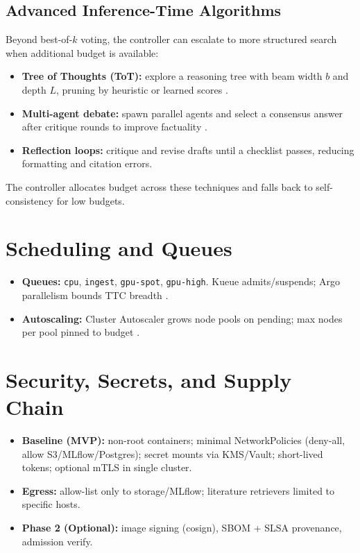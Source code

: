 \subsection{Advanced Inference-Time Algorithms}
Beyond best-of-\(k\) voting, the controller can escalate to more structured search when additional budget is available:
\begin{itemize}[leftmargin=1.4em]
\item \textbf{Tree of Thoughts (ToT):} explore a reasoning tree with beam width \(b\) and depth \(L\), pruning by heuristic or learned scores \cite{yao2023tot}.
\item \textbf{Multi-agent debate:} spawn parallel agents and select a consensus answer after critique rounds to improve factuality \cite{yao2023react}.
\item \textbf{Reflection loops:} critique and revise drafts until a checklist passes, reducing formatting and citation errors.
\end{itemize}
The controller allocates budget across these techniques and falls back to self-consistency for low budgets.

\section{Scheduling and Queues}
\begin{itemize}[leftmargin=1.4em]
\item \textbf{Queues:} \texttt{cpu}, \texttt{ingest}, \texttt{gpu-spot}, \texttt{gpu-high}. Kueue admits/suspends; Argo parallelism bounds TTC breadth \cite{kueueDocs,argoDocs}.
\item \textbf{Autoscaling:} Cluster Autoscaler grows node pools on pending; max nodes per pool pinned to budget \cite{k8sAutoscaler}.
\end{itemize}

\section{Security, Secrets, and Supply Chain}
\begin{itemize}[leftmargin=1.4em]
\item \textbf{Baseline (MVP):} non-root containers; minimal NetworkPolicies (deny-all, allow S3/MLflow/Postgres); secret mounts via KMS/Vault; short-lived tokens; optional mTLS in single cluster.
\item \textbf{Egress:} allow-list only to storage/MLflow; literature retrievers limited to specific hosts.
\item \textbf{Phase 2 (Optional):} image signing (cosign), SBOM + SLSA provenance, admission verify.
\end{itemize}

